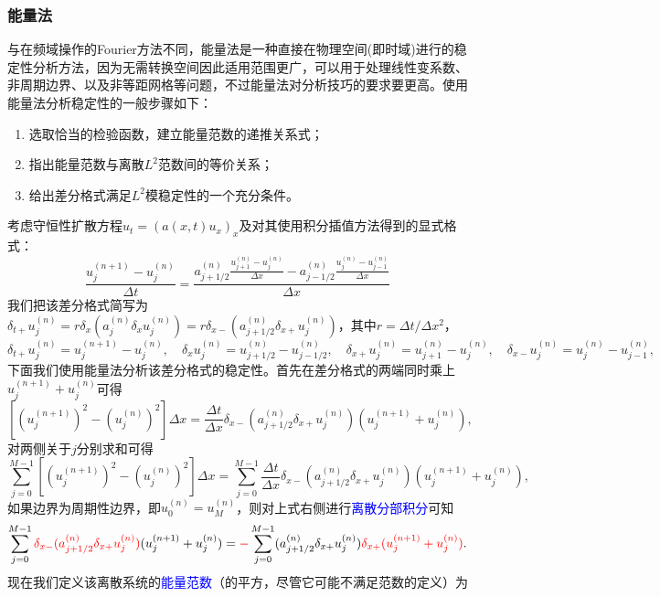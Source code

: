 \documentclass[a4paper,10pt]{ctexart}
\begin{document}
\subsubsection{能量法}
与在频域操作的Fourier方法不同，能量法是一种直接在物理空间(即时域)进行的稳定性分析方法，因为无需转换空间因此适用范围更广，可以用于处理线性变系数、非周期边界、以及非等距网格等问题，不过能量法对分析技巧的要求要更高。使用能量法分析稳定性的一般步骤如下：
\begin{enumerate}
    \item 选取恰当的检验函数，建立能量范数的递推关系式；
    \item 指出能量范数与离散$ L^2 $范数间的等价关系；
    \item 给出差分格式满足$ L^2 $模稳定性的一个充分条件。
\end{enumerate}
\begin{example}
    考虑守恒性扩散方程$ u_t = (a(x,t)u_x)_x $及对其使用积分插值方法得到的显式格式：
    \[
        \frac{u^{(n+1)}_j - u^{(n)}_j}{\Delta t} = \frac{a_{j+1 / 2}^{(n)}\frac{u^{(n)}_{j+1}-u^{(n)}_{j}}{\Delta x} - a_{j-1 / 2}^{(n)}\frac{u^{(n)}_{j}-u^{(n)}_{j-1}}{\Delta x}}{\Delta x}
    \]
    我们把该差分格式简写为$ \delta_{t+}u^{(n)}_j = r\delta_x(a^{(n)}_j \delta_xu^{(n)}_j) = r \delta_{x-}(a^{(n)}_{j+1/2}\delta_{x+}u^{(n)}_j) $，其中$ r = \Delta t / \Delta x^2 $，
    \[
        \delta_{t+}u^{(n)}_j = u^{(n+1)}_j - u^{(n)}_j,\quad \delta_xu^{(n)}_j = u^{(n)}_{j+1 / 2} - u^{(n)}_{j- 1/ 2},\quad \delta_{x+}u^{(n)}_j = u^{(n)}_{j+1} - u^{(n)}_j,\quad \delta_{x-}u^{(n)}_j = u^{(n)}_j - u^{(n)}_{j-1},
    \]
    下面我们使用能量法分析该差分格式的稳定性。首先在差分格式的两端同时乘上$ u^{(n+1)}_j+u^{(n)}_j $可得
    \[
        [(u^{(n+1)}_j)^2 - (u^{(n)}_j)^2]\Delta x = \frac{\Delta t}{\Delta x}\delta_{x-}(a^{(n)}_{j+1/2}\delta_{x+}u^{(n)}_j)(u^{(n+1)}_j+u^{(n)}_j),
    \]
    对两侧关于$ j $分别求和可得
    \[
        \sum_{j=0}^{M-1} [(u^{(n+1)}_j)^2 - (u^{(n)}_j)^2]\Delta x = \sum_{j=0}^{M-1} \frac{\Delta t}{\Delta x}\delta_{x-}(a^{(n)}_{j+1/2}\delta_{x+}u^{(n)}_j)(u^{(n+1)}_j+u^{(n)}_j),
    \]
    如果边界为周期性边界，即$ u^{(n)}_0 = u^{(n)}_M $，则对上式右侧进行\textcolor{blue}{离散分部积分}可知
    \[
        \sum_{j=0}^{M-1} \textcolor{red}{\delta_{x-}(a^{(n)}_{j+1/2}\delta_{x+}u^{(n)}_j)}(u^{(n+1)}_j+u^{(n)}_j) = \textcolor{red}{-}\sum_{j=0}^{M-1} (a^{(n)}_{j+1/2}\delta_{x+}u^{(n)}_j) \textcolor{red}{\delta_{x+}(u^{(n+1)}_j+u^{(n)}_j)}.
    \]
    现在我们定义该离散系统的\textcolor{blue}{能量范数}（的平方，尽管它可能不满足范数的定义）为
    \begin{equation}

\end{equation}
\end{example}
\end{document}
